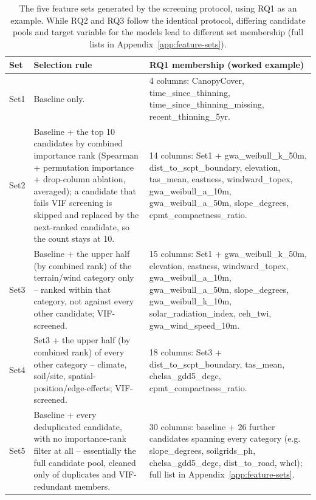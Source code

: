 \documentclass[11pt,a4paper]{report}
\begin{document}
\begin{table}[!htbp]
\centering
\scriptsize
\renewcommand{\arraystretch}{1.2}
\begin{tabular}{p{1cm}p{5.3cm}p{7.2cm}}
\toprule
Set & Selection rule & RQ1 membership (worked example) \\
\midrule
Set1 & Baseline only. & 4 columns: CanopyCover, time\_since\_thinning,
time\_since\_thinning\_missing, recent\_thinning\_5yr. \\
Set2 & Baseline + the top 10 candidates by combined importance rank (Spearman + permutation
importance + drop-column ablation, averaged); a candidate that fails VIF screening is skipped and
replaced by the next-ranked candidate, so the count stays at 10. & 14 columns: Set1 +
gwa\_weibull\_k\_50m, dist\_to\_scpt\_boundary, elevation, tas\_mean, eastness, windward\_topex,
gwa\_weibull\_a\_10m, gwa\_weibull\_a\_50m, slope\_degrees, cpmt\_compactness\_ratio. \\
Set3 & Baseline + the upper half (by combined rank) of the terrain/wind category only -- ranked
within that category, not against every other candidate; VIF-screened. & 15 columns: Set1 +
gwa\_weibull\_k\_50m, elevation, eastness, windward\_topex, gwa\_weibull\_a\_10m,
gwa\_weibull\_a\_50m, slope\_degrees, gwa\_weibull\_k\_10m, solar\_radiation\_index, ceh\_twi,
gwa\_wind\_speed\_10m. \\
Set4 & Set3 + the upper half (by combined rank) of every other category -- climate, soil/site,
spatial-position/edge-effects; VIF-screened. & 18 columns: Set3 + dist\_to\_scpt\_boundary,
tas\_mean, chelsa\_gdd5\_degc, cpmt\_compactness\_ratio. \\
Set5 & Baseline + every deduplicated candidate, with no importance-rank filter at all --
essentially the full candidate pool, cleaned only of duplicates and VIF-redundant members. & 30
columns: baseline + 26 further candidates spanning every category (e.g. slope\_degrees,
soilgrids\_ph, chelsa\_gdd5\_degc, dist\_to\_road, whcl); full list in
Appendix~\ref{app:feature-sets}. \\
\bottomrule
\end{tabular}
\caption{The five feature sets created by applying the screening steps above, here is the worked example for RQ1.
RQ2 and RQ3 apply the identical steps over their own candidate pools (different available variables,
different target column), therefore different final membership at each Set -- full membership
for all three research questions is given in Appendix~\ref{app:feature-sets}.}

\caption{The five feature sets generated by the screening protocol, using RQ1 as an example. While RQ2 and RQ3 follow the identical protocol, differing candidate pools and target variable for the models lead to different set membership (full lists in Appendix~\ref{app:feature-sets}).}
\label{tab:feature-sets-composition-rq1}
\end{table}
\end{document}
